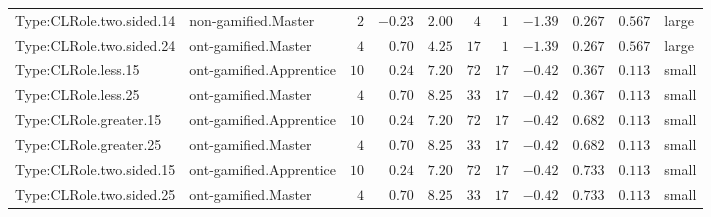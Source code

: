 \documentclass[6pt,a4paper]{article}
\begin{document}
{\begin{longtable}{llrrrrrrrrl}
Type:CLRole.two.sided.14&non-gamified.Master&$ 2$&$-0.23$&$ 2.00$&$  4$&$ 1$&$-1.39$&$0.267$&$0.567$&large\tabularnewline
Type:CLRole.two.sided.24&ont-gamified.Master&$ 4$&$ 0.70$&$ 4.25$&$ 17$&$ 1$&$-1.39$&$0.267$&$0.567$&large\tabularnewline
Type:CLRole.less.15&ont-gamified.Apprentice&$10$&$ 0.24$&$ 7.20$&$ 72$&$17$&$-0.42$&$0.367$&$0.113$&small\tabularnewline
Type:CLRole.less.25&ont-gamified.Master&$ 4$&$ 0.70$&$ 8.25$&$ 33$&$17$&$-0.42$&$0.367$&$0.113$&small\tabularnewline
Type:CLRole.greater.15&ont-gamified.Apprentice&$10$&$ 0.24$&$ 7.20$&$ 72$&$17$&$-0.42$&$0.682$&$0.113$&small\tabularnewline
Type:CLRole.greater.25&ont-gamified.Master&$ 4$&$ 0.70$&$ 8.25$&$ 33$&$17$&$-0.42$&$0.682$&$0.113$&small\tabularnewline
\newpage
Type:CLRole.two.sided.15&ont-gamified.Apprentice&$10$&$ 0.24$&$ 7.20$&$ 72$&$17$&$-0.42$&$0.733$&$0.113$&small\tabularnewline
Type:CLRole.two.sided.25&ont-gamified.Master&$ 4$&$ 0.70$&$ 8.25$&$ 33$&$17$&$-0.42$&$0.733$&$0.113$&small\tabularnewline
\hline
\end{longtable}}
\end{document}
